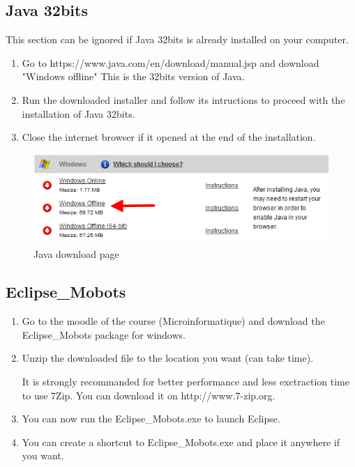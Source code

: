 \documentclass[a4paper]{article}
\begin{document}
\subsection{Java 32bits}
This section can be ignored if Java 32bits is already installed on your computer.

\begin{enumerate}
\item Go to https://www.java.com/en/download/manual.jsp and download "Windows offline" This is the 32bits version of Java.
\item Run the downloaded installer and follow its intructions to proceed with the installation of Java 32bits.
\item Close the internet browser if it opened at the end of the installation.
\end{enumerate}

\begin{figure}[!h]
\centering
\includegraphics[width=0.5\columnwidth]{fig/Java_Windows}
\caption{Java download page}
\label{fig:Java_windows}
\end{figure}


\subsection{Eclipse\_Mobots}

\begin{enumerate}
\item Go to the moodle of the course (Microinformatique) and download the Eclipse\_Mobots package for windows.
\item Unzip the downloaded file to the location you want (can take time). 

It is strongly recommanded for better performance and less exctraction time to use 7Zip. You can download it on http://www.7-zip.org.
\item You can now run the Eclipse\_Mobots.exe to launch Eclipse.
\item You can create a shortcut to Eclipse\_Mobots.exe and place it anywhere if you want.
\end{enumerate}
\end{document}
